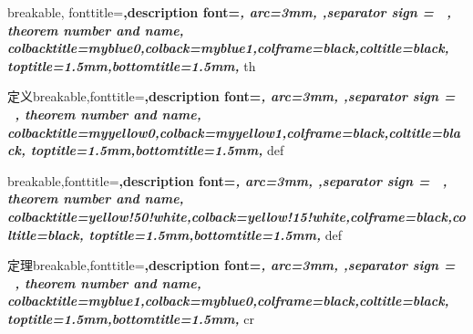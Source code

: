 \newcommand{\df}{\displaystyle \frac} 
\newcommand{\dlim}{\displaystyle \lim}
\newcommand{\dint}{\displaystyle \int}
\newcommand{\ra}{\rangle}
\newcommand{\la}{\langle}
\newcommand{\inner}[2]{{\langle #1,#2\rangle}}
\newcommand{\x}{\mathbf{x}}
\newcommand{\xt}{\mathbf{x}^{\mathsf{T}}}
\newcommand{\T}{{\mathsf{T}}}
\newcommand{\abf}{\mathbf{a}}
\newcommand{\abft}{\mathbf{a}^{\mathsf{T}}}
\newcommand{\R}{\mathbb{R}}
\newcommand{\C}{\mathbb{C}}
\newcommand{\E}{\mathrm{e}}
\newcommand{\F}{\mathbb{F}}
\newcommand{\X}{\mathbf{X}}
\newcommand{\Y}{\mathbf{Y}}
\newcommand{\f}{\mathbf{f}}
\newcommand{\U}{\mathbf{u}}
\newcommand{\D}{\mathrm{d}}
\newcommand{\MCG}{\mathcal{G}}
\newcommand{\MCF}{\mathcal{F}}
\newcommand{\M}{\mathcal{M}}
\newcommand{\MCB}{\mathcal{B}}
\newcommand{\MCT}{\mathcal{T}}
\newcommand{\LL}{\mathcal{L}}
\newcommand{\nullspace}{\mathrm{null}}
\newcommand{\range}{\mathrm{range}}
\newcommand{\Sum}[2]{{\sum_{#1}^{#2}}}
\newcommand{\Union}[2]{{\bigcup_{#1}^{#2}}}
\newcommand{\Intersection}[2]{{\bigcap_{#1}^{#2}}}

\newcommand{\pd}[1]{\frac{\partial}{\partial #1}}
{
	breakable,
	fonttitle=\bfseries\upshape,description font=\bfseries\itshape,
	arc=3mm, ,separator sign = \ ,
	theorem number and name,
	colbacktitle=myblue0,colback=myblue1,colframe=black,coltitle=black,
	toptitle=1.5mm,bottomtitle=1.5mm, 
}{th}

%
  {定义}{breakable,fonttitle=\bfseries\upshape,description font=\bfseries\itshape,
     arc=3mm, ,separator sign = \ ,
     theorem number and name,
     colbacktitle=myyellow0,colback=myyellow1,colframe=black,coltitle=black,
     toptitle=1.5mm,bottomtitle=1.5mm,
     }{def}
     
%
  {}{breakable,fonttitle=\bfseries\upshape,description font=\bfseries\itshape,
     arc=3mm, ,separator sign = \ ,
     theorem number and name,
     colbacktitle=yellow!50!white,colback=yellow!15!white,colframe=black,coltitle=black,
     toptitle=1.5mm,bottomtitle=1.5mm,
     }{def}

%
  {定理}{breakable,fonttitle=\bfseries\upshape,description font=\bfseries\itshape,
     arc=3mm, ,separator sign = \ ,
     theorem number and name,
     colbacktitle=myblue1,colback=myblue0,colframe=black,coltitle=black,
     toptitle=1.5mm,bottomtitle=1.5mm,
     }{cr}
     
